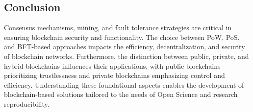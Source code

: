 \documentclass{article}
\begin{document}
\subsection{Conclusion}
Consensus mechanisms, mining, and fault tolerance strategies are critical in ensuring blockchain security and functionality. The choice between PoW, PoS, and BFT-based approaches impacts the efficiency, decentralization, and security of blockchain networks. Furthermore, the distinction between public, private, and hybrid blockchains influences their applications, with public blockchains prioritizing trustlessness and private blockchains emphasizing control and efficiency. Understanding these foundational aspects enables the development of blockchain-based solutions tailored to the needs of Open Science and research reproducibility.




\end{document}
